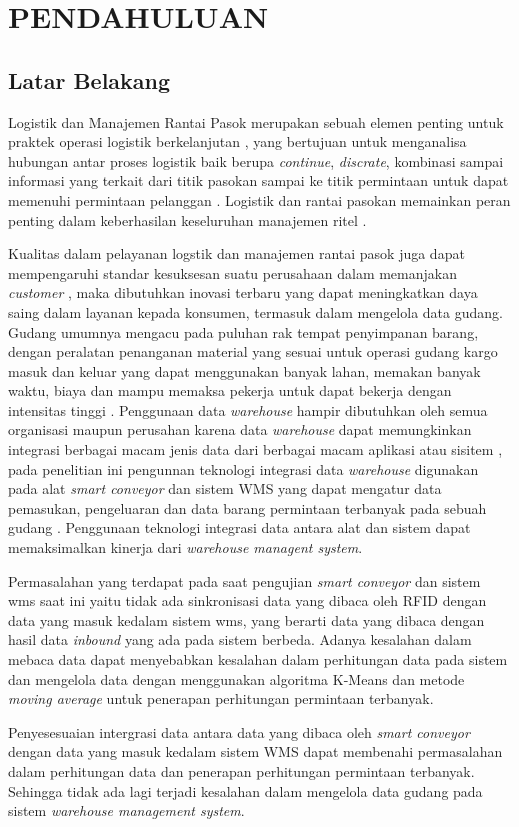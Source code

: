 \chapter{PENDAHULUAN}

\section{Latar Belakang}

\par
Logistik dan Manajemen Rantai Pasok merupakan sebuah elemen penting untuk praktek operasi logistik berkelanjutan \cite{grant2017sustainable}, yang bertujuan untuk menganalisa hubungan antar proses logistik baik berupa \textit{continue}, \textit{discrate}, kombinasi sampai informasi yang terkait dari titik pasokan sampai ke titik permintaan untuk dapat memenuhi permintaan pelanggan \cite{mahendrawathi2015service}. Logistik dan rantai pasokan memainkan peran penting dalam keberhasilan keseluruhan manajemen ritel \cite{fernie2018logistics}. 
\par Kualitas dalam pelayanan logstik dan manajemen rantai pasok juga dapat mempengaruhi standar kesuksesan suatu perusahaan dalam memanjakan \textit{customer} \cite{pane2019implementasi}, maka dibutuhkan inovasi terbaru yang dapat meningkatkan daya saing dalam layanan kepada konsumen, termasuk dalam mengelola data gudang. Gudang umumnya mengacu pada puluhan rak tempat penyimpanan barang, dengan peralatan penanganan material yang sesuai untuk operasi gudang kargo masuk dan keluar yang dapat menggunakan banyak lahan, memakan banyak waktu, biaya dan mampu memaksa pekerja untuk dapat bekerja dengan intensitas tinggi \cite{zhou2016warehouse}. Penggunaan data \textit{warehouse} hampir dibutuhkan oleh semua organisasi maupun perusahan karena data \textit{warehouse} dapat memungkinkan integrasi berbagai macam jenis data dari berbagai macam aplikasi atau sisitem \cite{khan2016privacy}, pada penelitian ini pengunnan teknologi integrasi data \textit{warehouse} digunakan pada alat \textit{smart conveyor} dan sistem WMS yang dapat mengatur data pemasukan, pengeluaran dan data barang permintaan terbanyak pada sebuah gudang \cite{pane2018qualitative}. Penggunaan teknologi integrasi data antara alat dan sistem dapat memaksimalkan kinerja dari \textit{warehouse managent system}. 
\par Permasalahan yang terdapat pada saat pengujian \textit{smart conveyor} dan sistem wms saat ini yaitu tidak ada sinkronisasi data yang dibaca oleh RFID dengan data yang masuk kedalam sistem wms, yang berarti data yang dibaca dengan hasil data \textit{inbound} yang ada pada sistem berbeda. Adanya kesalahan dalam mebaca data dapat menyebabkan kesalahan dalam perhitungan data pada sistem dan mengelola data dengan menggunakan algoritma K-Means dan metode \textit{moving average} \cite{awangga2018k} untuk penerapan perhitungan permintaan terbanyak.
\par Penyesesuaian intergrasi data antara data yang dibaca oleh \textit{smart conveyor} dengan data yang masuk kedalam sistem WMS dapat membenahi permasalahan dalam perhitungan data dan penerapan perhitungan permintaan terbanyak. Sehingga tidak ada lagi terjadi kesalahan dalam mengelola data gudang pada sistem \textit{warehouse management system}. \break


